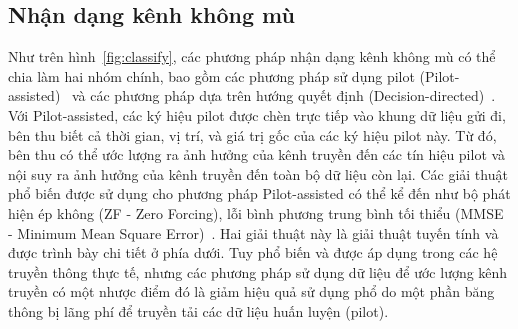 \subsection{Nhận dạng kênh không mù}
Như trên hình~\ref{fig:classify}, các phương pháp nhận dạng kênh không mù có thể chia làm hai nhóm chính, bao gồm các phương pháp sử dụng pilot (Pilot-assisted)~\cite{vilas2022} và các phương pháp dựa trên hướng quyết định (Decision-directed)~\cite{Ozdemir2007}. 
Với Pilot-assisted, các ký hiệu pilot được chèn trực tiếp vào khung dữ liệu gửi đi, bên thu biết cả thời gian, vị trí, và giá trị gốc của các ký hiệu pilot này. Từ đó, bên thu có thể ước lượng ra ảnh hưởng của kênh truyền đến các tín hiệu pilot và nội suy ra ảnh hưởng của kênh truyền đến toàn bộ dữ liệu còn lại. Các giải thuật phổ biến được sử dụng cho phương pháp Pilot-assisted có thể kể đến như bộ phát hiện ép không (ZF - Zero Forcing), lỗi bình phương trung bình tối thiểu (MMSE - Minimum Mean Square Error)~\cite{Jiang2011}. Hai giải thuật này là giải thuật tuyến tính và được trình bày chi tiết ở phía dưới.
Tuy phổ biến và được áp dụng trong các hệ truyền thông thực tế, nhưng các phương pháp sử dụng dữ liệu để ước lượng kênh truyền có một nhược điểm đó là giảm hiệu quả sử dụng phổ do một phần băng thông bị lãng phí để truyền tải các dữ liệu huấn luyện (pilot).

